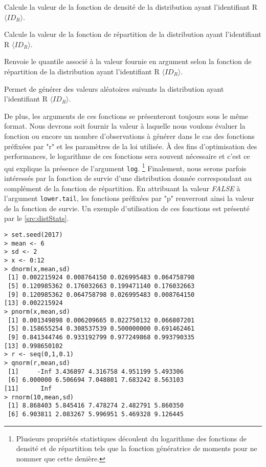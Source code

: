 \begin{description}[style=multiline,leftmargin=2cm]
	\item[$d\langle ID_R \rangle$] Calcule la valeur de la fonction de densité de la distribution ayant l'identifiant R $\langle ID_R \rangle$.
	\item[$p\langle ID_R \rangle$] Calcule la valeur de la fonction de répartition de la distribution ayant l'identifiant R $\langle ID_R \rangle$.
	\item[$q\langle ID_R \rangle$] Renvoie le quantile associé à la valeur fournie en argument selon  la fonction de répartition de la distribution ayant l'identifiant R $\langle ID_R \rangle$.
	\item[$r\langle ID_R \rangle$] Permet de générer des valeurs aléatoires suivants la distribution ayant l'identifiant R $\langle ID_R \rangle$.
\end{description}

De plus, les arguments de ces fonctions se présenteront toujours sous le même format. Nous devrons soit fournir la valeur à laquelle nous voulons évaluer la fonction ou encore un nombre d'observations à générer dans le cas des fonctions préfixées par "r" et les paramètres de la loi utilisée. À des fins d'optimisation des performances, le logarithme de ces fonctions sera souvent nécessaire et c'est ce qui explique la présence de l'argument \texttt{log}. \footnote{Plusieurs propriétés statistiques découlent du logarithme des fonctions de densité et de répartition tels que la fonction génératrice de moments pour ne nommer que cette denière.} Finalement, nous serons parfois intéressés par la fonction de survie d'une distribution donnée correspondant au complément de la fonction de répartition. En attribuant la valeur \textit{FALSE} à l'argument \texttt{lower.tail}, les fonctions préfixées par "p" renverront ainsi la valeur de la fonction de survie. Un exemple d'utilisation de ces fonctions est présenté par le \autoref{src:distStats}. \\

\begin{lstlisting}[caption = Fonctions relatives à la distribution Normale,label=src:distStats]
> set.seed(2017)
> mean <- 6
> sd <- 2
> x <- 0:12
> dnorm(x,mean,sd)
 [1] 0.002215924 0.008764150 0.026995483 0.064758798
 [5] 0.120985362 0.176032663 0.199471140 0.176032663
 [9] 0.120985362 0.064758798 0.026995483 0.008764150
[13] 0.002215924
> pnorm(x,mean,sd)
 [1] 0.001349898 0.006209665 0.022750132 0.066807201
 [5] 0.158655254 0.308537539 0.500000000 0.691462461
 [9] 0.841344746 0.933192799 0.977249868 0.993790335
[13] 0.998650102
> r <- seq(0,1,0.1)
> qnorm(r,mean,sd)
 [1]     -Inf 3.436897 4.316758 4.951199 5.493306
 [6] 6.000000 6.506694 7.048801 7.683242 8.563103
[11]      Inf
> rnorm(10,mean,sd)
 [1] 8.868403 5.845416 7.478274 2.482791 5.860350
 [6] 6.903811 2.083267 5.996951 5.469328 9.126445
\end{lstlisting}

